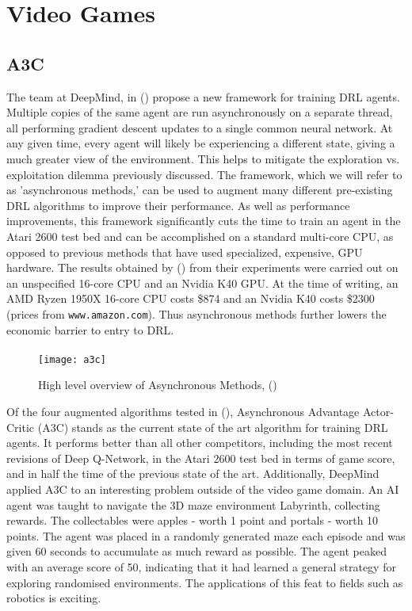 \section{Video Games}

\subsection{A3C} \label{sec:a3c}
The team at DeepMind, in (\citet{a3c}) propose a new framework for training DRL agents. Multiple copies of the same agent are run asynchronously on a separate thread, all performing gradient descent updates to a single common neural network. At any given time, every agent will likely be experiencing a different state, giving a much greater view of the environment. This helps to mitigate the exploration vs. exploitation dilemma previously discussed. The framework, which we will refer to as 'asynchronous methods,' can be used to augment many different pre-existing DRL algorithms to improve their performance. As well as performance improvements, this framework significantly cuts the time to train an agent in the Atari 2600 test bed and can be accomplished on a standard multi-core CPU, as opposed to previous methods that have used specialized, expensive, GPU hardware. The results obtained by (\citet{a3c}) from their experiments were carried out on an unspecified 16-core CPU and an Nvidia K40 GPU. At the time of writing, an AMD Ryzen 1950X 16-core CPU costs \$874 and an Nvidia K40 costs \$2300 (prices from \texttt{www.amazon.com}). Thus asynchronous methods further lowers the economic barrier to entry to DRL. \paragraph{}

\begin{figure}[H]
    \centering
    \texttt{[image: a3c]}
    \caption{High level overview of Asynchronous Methods, (\citet{a3cimage})}
\end{figure}

Of the four augmented algorithms tested in (\citet{a3c}), Asynchronous Advantage Actor-Critic (A3C) stands as the current state of the art algorithm for training DRL agents. It performs better than all other competitors, including the most recent revisions of Deep Q-Network, in the Atari 2600 test bed in terms of game score, and in half the time of the previous state of the art. Additionally, DeepMind applied A3C to an interesting problem outside of the video game domain. An AI agent was taught to navigate the 3D maze environment Labyrinth, collecting rewards. The collectables were apples - worth 1 point and portals - worth 10 points. The agent was placed in a randomly generated maze each episode and was given 60 seconds to accumulate as much reward as possible. The agent peaked with an average score of 50, indicating that it had learned a general strategy for exploring randomised environments. The applications of this feat to fields such as robotics is exciting.

